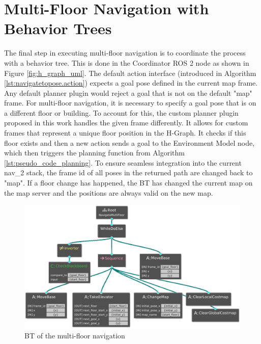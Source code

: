 \section{Multi-Floor Navigation with Behavior Trees}
\label{sec:multi_floor_behavior_trees}
The final step in executing multi-floor navigation is to coordinate the process with a behavior tree. This is done in the Coordinator ROS 2 node as shown in Figure \ref{fig:h_graph_uml}. The default action interface (introduced in Algorithm \ref{lst:navigatetopose.action}) expects a goal pose defined in the current map frame. Any default planner plugin would reject a goal that is not on the default "map" frame. For multi-floor navigation, it is necessary to specify a goal pose that is on a different floor or building. To account for this, the custom planner plugin proposed in this work handles the given frame differently. It allows for custom frames that represent a unique floor position in the H-Graph. It checks if this floor exists and then a new action sends a goal to the Environment Model node, which then triggers the planning function from Algorithm \ref{lst:pseudo_code_planning}. To ensure seamless integration into the current \gls{nav_2} stack, the frame id of all poses in the returned path are changed back to "map". If a floor change has happened, the BT has changed the current map on the map server and the positions are always valid on the new map.

\begin{figure}[h]
    \centering
    \includegraphics[width=\textwidth]{figures/50_implementation/bt_navigate_multi_floor.png}
    \caption[BT of the multi-floor navigation]{BT of the multi-floor navigation}
    \label{fig:bt_navigate_multi_floor}
\end{figure}

